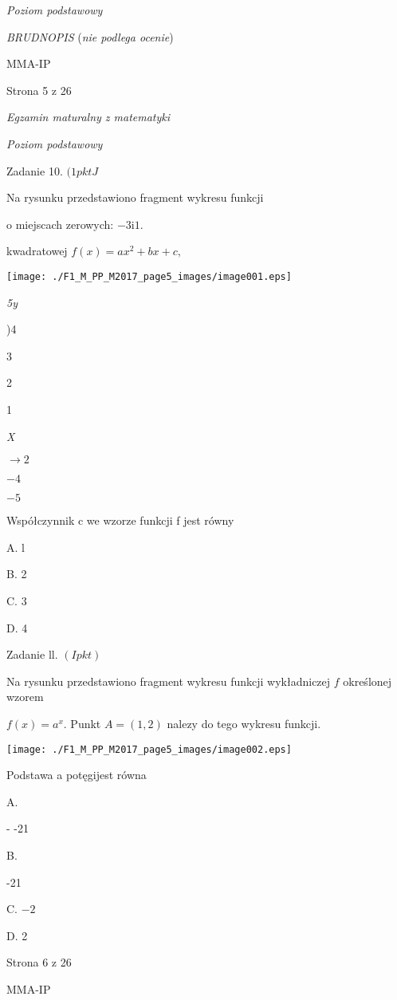 \documentclass[a4paper,12pt]{article}
\begin{document}
{\it Poziom podstawowy}

{\it BRUDNOPIS} ({\it nie podlega ocenie})

MMA-IP

Strona 5 z 26





{\it Egzamin maturalny z matematyki}

{\it Poziom podstawowy}

Zadanie 10. $(1pktJ$

Na rysunku przedstawiono fragment wykresu funkcji

o miejscach zerowych: $-3 \mathrm{i}1.$

kwadratowej $f(x)=ax^{2}+bx+c,$
\begin{center}
\texttt{[image: ./F1\_M\_PP\_M2017\_page5\_images/image001.eps]}
\end{center}
{\it 5y}

)4

3

2

1

{\it X}

$\rightarrow 2$

$-4$

$-5$

Współczynnik c we wzorze funkcji f jest równy

A. l

B. 2

C. 3

D. 4

Zadanie ll. $(Ipkt)$

Na rysunku przedstawiono fragment wykresu funkcji wykładniczej $f$ określonej wzorem

$f(x)=a^{x}$. Punkt $A=(1,2)$ nalezy do tego wykresu funkcji.
\begin{center}
\texttt{[image: ./F1\_M\_PP\_M2017\_page5\_images/image002.eps]}
\end{center}
Podstawa a potęgijest równa

A.

- -21

B.

-21

C. $-2$

D. 2

Strona 6 z 26

MMA-IP
\end{document}
